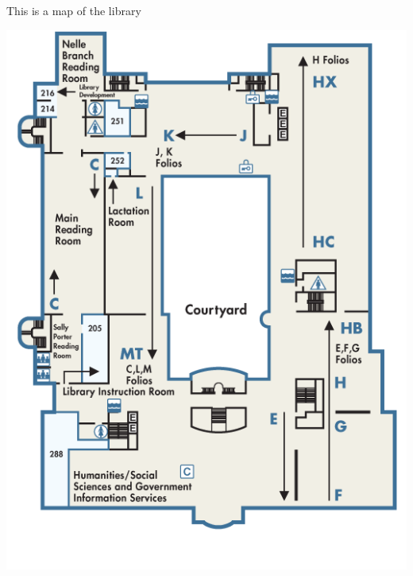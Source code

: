 \documentclass{article}
\begin{document}
This is a map of the library

\includegraphics{map-shields-2.png}
\end{document}
